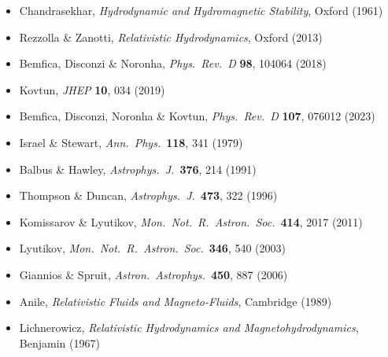 \begin{itemize}
  \item Chandrasekhar, \textit{Hydrodynamic and Hydromagnetic Stability},
    Oxford (1961) \citep{Chandrasekhar1961}
  \item Rezzolla \& Zanotti, \textit{Relativistic Hydrodynamics},
    Oxford (2013) \citep{RezzollaZanotti2013}
  \item Bemfica, Disconzi \& Noronha, \textit{Phys.\ Rev.\ D}
    \textbf{98}, 104064 (2018) \citep{BemficaDN2018}
  \item Kovtun, \textit{JHEP} \textbf{10}, 034 (2019) \citep{Kovtun2019}
  \item Bemfica, Disconzi, Noronha \& Kovtun, \textit{Phys.\ Rev.\ D}
    \textbf{107}, 076012 (2023) \citep{BemficaDNK2023}
  \item Israel \& Stewart, \textit{Ann.\ Phys.}\ \textbf{118}, 341
    (1979) \citep{IsraelStewart1979}
  \item Balbus \& Hawley, \textit{Astrophys.\ J.}\ \textbf{376}, 214
    (1991) \citep{BalbusSHawley1991}
  \item Thompson \& Duncan, \textit{Astrophys.\ J.}\ \textbf{473}, 322
    (1996) \citep{ThompsonDuncan1996}
  \item Komissarov \& Lyutikov, \textit{Mon.\ Not.\ R.\ Astron.\ Soc.}\
    \textbf{414}, 2017 (2011) \citep{KomissarovLyutikov2011}
  \item Lyutikov, \textit{Mon.\ Not.\ R.\ Astron.\ Soc.}\
    \textbf{346}, 540 (2003) \citep{Lyutikov2003}
  \item Giannios \& Spruit, \textit{Astron.\ Astrophys.}\ \textbf{450},
    887 (2006) \citep{GianniosSpruit2006}
  \item Anile, \textit{Relativistic Fluids and Magneto-Fluids},
    Cambridge (1989) \citep{Anile1989}
  \item Lichnerowicz, \textit{Relativistic Hydrodynamics and
    Magnetohydrodynamics}, Benjamin (1967) \citep{Lichnerowicz1967}
\end{itemize}
